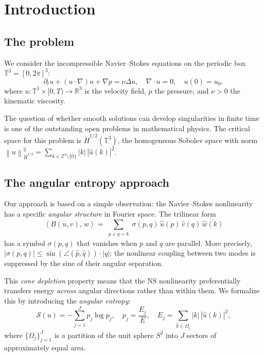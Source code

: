 \documentclass[11pt]{article}
\theoremstyle{definition}
\newcommand{\R}{\mathbb{R}}
\newcommand{\Z}{\mathbb{Z}}
\newcommand{\T}{\mathbb{T}}
\newcommand{\norm}[1]{\left\| #1 \right\|}
\newcommand{\ip}[2]{\left\langle #1,\, #2 \right\rangle}
\newcommand{\Hdot}[1]{\dot{H}^{#1}}
\newcommand{\cS}{\mathcal{S}}
\begin{document}
\tableofcontents
\newpage


\section{Introduction}\label{sec:intro}

\subsection{The problem}

We consider the incompressible Navier--Stokes equations
on the periodic box $\T^3 = [0,2\pi]^3$:
\begin{equation}\label{eq:NS}
\partial_t u + (u\cdot\nabla)u + \nabla p = \nu\Delta u,
\quad \nabla\cdot u = 0,
\quad u(0) = u_0,
\end{equation}
where $u : \T^3\times[0,T) \to \R^3$ is the velocity field,
$p$ the pressure, and $\nu > 0$ the kinematic viscosity.

The question of whether smooth solutions can develop
singularities in finite time is one of the outstanding open
problems in mathematical physics.  The critical space for
this problem is $\Hdot{1/2}(\T^3)$, the homogeneous Sobolev
space with norm
$\norm{u}_{\Hdot{1/2}}^2 = \sum_{k\in\Z^3\setminus\{0\}}
|k|\,|\hat{u}(k)|^2$.


\subsection{The angular entropy approach}

Our approach is based on a simple observation: the
Navier--Stokes nonlinearity has a specific \emph{angular
structure} in Fourier space.  The trilinear form
\begin{equation}\label{eq:trilinear}
\ip{B(u,v)}{w} = \sum_{\substack{p+q=k}}
\sigma(p,q)\,\hat{u}(p)\,\hat{v}(q)\,
\overline{\hat{w}(k)}
\end{equation}
has a symbol $\sigma(p,q)$ that vanishes when $p$ and $q$ are
parallel.  More precisely, $|\sigma(p,q)| \leq
\sin(\angle(\hat{p},\hat{q}))\cdot|q|$: the nonlinear
coupling between two modes is suppressed by the sine of
their angular separation.

This \emph{cone depletion} property means that the NS
nonlinearity preferentially transfers energy \emph{across}
angular directions rather than within them.  We formalize
this by introducing the \emph{angular entropy}:
\begin{equation}\label{eq:S-def}
\cS(u) = -\sum_{j=1}^J p_j \log p_j,
\quad p_j = \frac{E_j}{E},
\quad E_j = \sum_{\hat{k}\in\Omega_j}|k|\,|\hat{u}(k)|^2,
\end{equation}
where $\{\Omega_j\}_{j=1}^J$ is a partition of the unit
sphere $S^2$ into $J$ sectors of approximately equal area.
\end{document}
